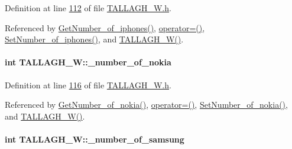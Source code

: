 Definition at line \hyperlink{_t_a_l_l_a_g_h___w_8h_source_l00112}{112} of file \hyperlink{_t_a_l_l_a_g_h___w_8h_source}{T\+A\+L\+L\+A\+G\+H\+\_\+\+W.\+h}.



Referenced by \hyperlink{_t_a_l_l_a_g_h___w_8cpp_source_l00111}{Get\+Number\+\_\+of\+\_\+iphones()}, \hyperlink{_t_a_l_l_a_g_h___w_8h_source_l00075}{operator=()}, \hyperlink{_t_a_l_l_a_g_h___w_8cpp_source_l00107}{Set\+Number\+\_\+of\+\_\+iphones()}, and \hyperlink{_t_a_l_l_a_g_h___w_8h_source_l00024}{T\+A\+L\+L\+A\+G\+H\+\_\+\+W()}.

\paragraph[{\texorpdfstring{\+\_\+number\+\_\+of\+\_\+nokia}{_number_of_nokia}}]{\setlength{\rightskip}{0pt plus 5cm}int T\+A\+L\+L\+A\+G\+H\+\_\+\+W\+::\+\_\+number\+\_\+of\+\_\+nokia\hspace{0.3cm}{\ttfamily [private]}}\hypertarget{class_t_a_l_l_a_g_h___w_aa095820dca65526e795d64f31a3aaec1_aa095820dca65526e795d64f31a3aaec1}{}\label{class_t_a_l_l_a_g_h___w_aa095820dca65526e795d64f31a3aaec1_aa095820dca65526e795d64f31a3aaec1}


Definition at line \hyperlink{_t_a_l_l_a_g_h___w_8h_source_l00116}{116} of file \hyperlink{_t_a_l_l_a_g_h___w_8h_source}{T\+A\+L\+L\+A\+G\+H\+\_\+\+W.\+h}.



Referenced by \hyperlink{_t_a_l_l_a_g_h___w_8cpp_source_l00079}{Get\+Number\+\_\+of\+\_\+nokia()}, \hyperlink{_t_a_l_l_a_g_h___w_8h_source_l00075}{operator=()}, \hyperlink{_t_a_l_l_a_g_h___w_8cpp_source_l00075}{Set\+Number\+\_\+of\+\_\+nokia()}, and \hyperlink{_t_a_l_l_a_g_h___w_8h_source_l00024}{T\+A\+L\+L\+A\+G\+H\+\_\+\+W()}.

\paragraph[{\texorpdfstring{\+\_\+number\+\_\+of\+\_\+samsung}{_number_of_samsung}}]{\setlength{\rightskip}{0pt plus 5cm}int T\+A\+L\+L\+A\+G\+H\+\_\+\+W\+::\+\_\+number\+\_\+of\+\_\+samsung\hspace{0.3cm}{\ttfamily [private]}}\hypertarget{class_t_a_l_l_a_g_h___w_a2438dbd2a390036bfd35f46a63b5b9bf_a2438dbd2a390036bfd35f46a63b5b9bf}{}\label{class_t_a_l_l_a_g_h___w_a2438dbd2a390036bfd35f46a63b5b9bf_a2438dbd2a390036bfd35f46a63b5b9bf}


